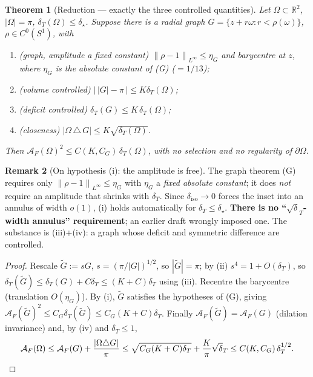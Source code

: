 \documentclass[11pt]{article}
\newtheorem{theorem}{Theorem}
\theoremstyle{definition}
\newtheorem{remark}[theorem]{Remark}
\newcommand{\R}{\mathbb R}
\newcommand{\Om}{\Omega}
\newcommand{\dT}{\delta_T}
\newcommand{\diso}{\delta_{\mathrm{iso}}}
\newcommand{\AF}{\mathcal A_F}
\newcommand{\norm}[1]{\left\|#1\right\|}
\newcommand{\abs}[1]{\left|#1\right|}
\begin{document}
\begin{theorem}[Reduction --- exactly the three controlled quantities]
\label{thm:reduction}
Let $\Om\subset\R^2$, $\abs\Om=\pi$, $\dT(\Om)\le\delta_\star$. Suppose
there is a \emph{radial graph} $G=\{z+r\omega:r<\rho(\omega)\}$,
$\rho\in C^0(S^1)$, with
\begin{enumerate}[label=\textup{(\roman*)},leftmargin=2.2em]
\item \textup{(graph, amplitude a fixed constant)}
$\norm{\rho-1}_{L^\infty}\le\eta_G$ and barycentre at $z$, where $\eta_G$
is the \emph{absolute} constant of \textup{(G)} \textup{(}$=1/13$\textup{)};
\item \textup{(volume controlled)} $\abs{\,\abs G-\pi\,}\le K\dT(\Om)$;
\item \textup{(deficit controlled)} $\dT(G)\le K\,\dT(\Om)$;
\item \textup{(closeness)} $\abs{\Om\,\triangle\,G}\le K\sqrt{\dT(\Om)}$.
\end{enumerate}
Then $\AF(\Om)^2\le C(K,C_G)\,\dT(\Om)$, with \emph{no} selection and
\emph{no} regularity of $\partial\Om$.
\end{theorem}

\begin{remark}[On hypothesis (i): the amplitude is free]\label{rem:amplitude}
The graph theorem (G) requires only $\norm{\rho-1}_{L^\infty}\le\eta_G$
with $\eta_G$ a \emph{fixed absolute constant}; it does \emph{not} require
an amplitude that shrinks with $\dT$. Since $\diso\to0$ forces the inset
into an annulus of width $o(1)$, (i) holds automatically for
$\dT\le\delta_\star$. \textbf{There is no ``$\sqrt\dT$-width annulus''
requirement}; an earlier draft wrongly imposed one. The substance is
(iii)+(iv): a graph whose deficit and symmetric difference are controlled.
\end{remark}

\begin{proof}
Rescale $\widetilde G:=sG$, $s=(\pi/\abs G)^{1/2}$, so
$\abs{\widetilde G}=\pi$; by (ii) $s^4=1+O(\dT)$, so
$\dT(\widetilde G)\le\dT(G)+C\dT\le(K+C)\dT$ using (iii). Recentre the
barycentre (translation $O(\eta_G)$). By (i), $\widetilde G$ satisfies the
hypotheses of (G), giving $\AF(\widetilde G)^2\le C_G\dT(\widetilde G)\le
C_G(K+C)\dT$. Finally $\AF(\widetilde G)=\AF(G)$ (dilation invariance) and,
by (iv) and $\dT\le1$,
\[
   \AF(\Om)\le\AF(G)+\frac{\abs{\Om\triangle G}}{\pi}
   \le\sqrt{C_G(K+C)\dT}+\frac K\pi\sqrt\dT\le C(K,C_G)\,\dT^{1/2}.\qedhere
\]
\end{proof}
\end{document}
